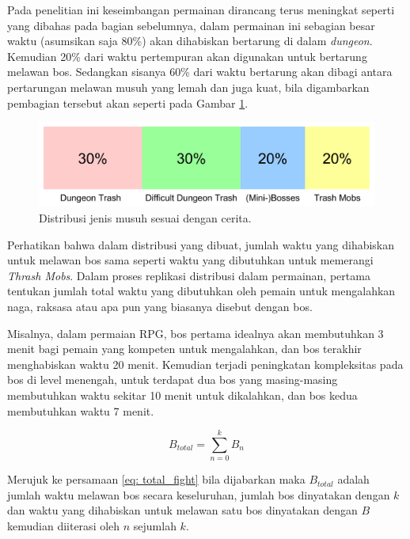 \begin{subs}
\begin{enumerate}[label=\textbf{\arabic*).}]
		Pada penelitian ini keseimbangan permainan dirancang terus meningkat seperti yang dibahas pada bagian sebelumnya, dalam permainan ini sebagian besar waktu (asumsikan saja 80\%) akan dihabiskan bertarung di dalam \textit{dungeon}. Kemudian 20\% dari waktu pertempuran akan digunakan untuk bertarung melawan bos. Sedangkan sisanya 60\% dari waktu bertarung akan dibagi antara pertarungan melawan musuh yang lemah dan juga kuat, bila digambarkan pembagian tersebut akan seperti pada Gambar \ref{fig:enemy_difficulty_percentage}.
		\vspace{1ex}
		
		\begin{figure} [!h] \centering
			\includegraphics[scale=0.15]{img/enemy_type_distribution.png}
			\caption{Distribusi jenis musuh sesuai dengan cerita.}
			\label{fig:enemy_difficulty_percentage}
		\end{figure}
		
		Perhatikan bahwa dalam distribusi yang dibuat, jumlah waktu yang dihabiskan untuk melawan bos sama seperti waktu yang dibutuhkan untuk memerangi \textit{Thrash Mobs}. Dalam proses replikasi distribusi dalam permainan, pertama tentukan jumlah total waktu yang dibutuhkan oleh pemain untuk mengalahkan naga, raksasa atau apa pun yang biasanya disebut dengan bos.
		\vspace{1ex}
		
		Misalnya, dalam permaian RPG, bos pertama idealnya akan membutuhkan 3 menit bagi pemain yang kompeten untuk mengalahkan, dan bos terakhir menghabiskan waktu 20 menit. Kemudian terjadi peningkatan kompleksitas pada bos di level menengah, untuk terdapat dua bos yang masing-masing membutuhkan waktu sekitar 10 menit untuk dikalahkan, dan bos kedua membutuhkan waktu 7 menit.
		
		\begin{equation}
		\label{eq: total_fight}
		B_{total} = \sum_{n = 0}^{k} B_{n}
		\end{equation}
		
		Merujuk ke persamaan \ref{eq: total_fight} bila dijabarkan maka $B_{total}$ adalah jumlah waktu melawan bos secara keseluruhan, jumlah bos dinyatakan dengan $k$ dan waktu yang dihabiskan untuk melawan satu bos dinyatakan dengan $B$ kemudian diiterasi oleh $n$ sejumlah $k$.
		\vspace{1ex}
		

\end{enumerate}
\end{subs}
